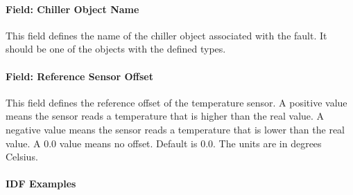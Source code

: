 \paragraph{Field: Chiller Object Name}\label{field-chiller-object-name}

This field defines the name of the chiller object associated with the fault. It should be one of the objects with the defined types.

\paragraph{Field: Reference Sensor Offset}\label{field-reference-sensor-offset}

This field defines the reference offset of the temperature sensor. A positive value means the sensor reads a temperature that is higher than the real value. A negative value means the sensor reads a temperature that is lower than the real value. A 0.0 value means no offset. Default is 0.0. The units are in degrees Celsius.

\paragraph{IDF Examples}

